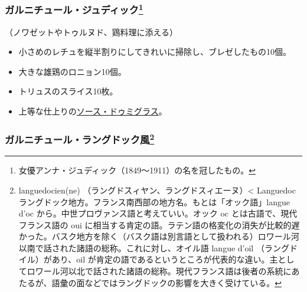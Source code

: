 \begin{recette}
\hypertarget{garniture-judic}{%
\subsubsection[ガルニチュール・ジュディック]{\texorpdfstring{ガルニチュール・ジュディック\footnote{女優アンナ・ジュディック（1849〜1911）の名を冠したもの。}}{ガルニチュール・ジュディック}}\label{garniture-judic}}



（ノワゼットやトゥルヌド、鶏料理に添える）

\begin{itemize}
\item
  小さめのレチュを縦半割りにしてきれいに掃除し、ブレゼしたもの10個。
\item
  大きな雄鶏のロニョン10個。
\item
  トリュスのスライス10枚。
\item
  上等な仕上りの\protect\hyperlink{sauce-demi-glace}{ソース・ドゥミグラス}。
\end{itemize}

\hypertarget{garniture-languedocienne}{%
\subsubsection[ガルニチュール・ラングドック風]{\texorpdfstring{ガルニチュール・ラングドック風\footnote{languedocien(ne)
  （ラングドスィヤン、ラングドスィエーヌ）\textless{} Languedoc
  ラングドック地方。フランス南西部の地方名。もとは「オック語」langue
  d'oc から。中世プロヴァンス語と考えていい。オック oc
  とは古語で、現代フランス語の oui
  に相当する肯定の語。ラテン語の格変化の消失が比較的遅かった。バスク地方を除く（バスク語は別言語として扱われる）ロワール河以南で話された諸語の総称。これに対し、オイル語
  langue d'oil （ラングドイル）があり、oil
  が肯定の語であるというところが代表的な違い。主としてロワール河以北で話された諸語の総称。現代フランス語は後者の系統にあたるが、語彙の面などではラングドックの影響を大きく受けている。}}{ガルニチュール・ラングドック風}}\label{garniture-languedocienne}}




\end{recette}
